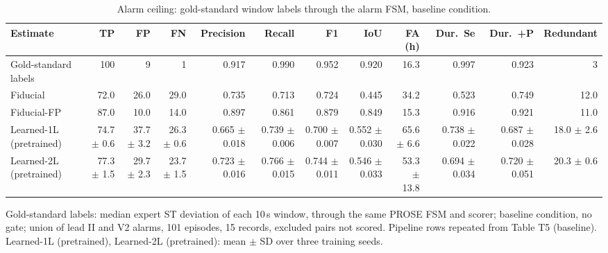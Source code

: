 \begin{table}[htbp]
\centering
\small
\caption{Alarm ceiling: gold-standard window labels through the alarm FSM, baseline condition.}
\label{tab:t5b_ceiling}
\begin{tabular}{lrrrrrrrrrrr}
\toprule
Estimate & TP & FP & FN & Precision & Recall & F1 & IoU & FA (h) & Dur.\ Se & Dur.\ +P & Redundant \\
\midrule
Gold-standard labels & 100 & 9 & 1 & 0.917 & 0.990 & 0.952 & 0.920 & 16.3 & 0.997 & 0.923 & 3 \\
\midrule
Fiducial & 72.0 & 26.0 & 29.0 & 0.735 & 0.713 & 0.724 & 0.445 & 34.2 & 0.523 & 0.749 & 12.0 \\
Fiducial-FP & 87.0 & 10.0 & 14.0 & 0.897 & 0.861 & 0.879 & 0.849 & 15.3 & 0.916 & 0.921 & 11.0 \\
Learned-1L (pretrained) & 74.7 $\pm$ 0.6 & 37.7 $\pm$ 3.2 & 26.3 $\pm$ 0.6 & 0.665 $\pm$ 0.018 & 0.739 $\pm$ 0.006 & 0.700 $\pm$ 0.007 & 0.552 $\pm$ 0.030 & 65.6 $\pm$ 6.6 & 0.738 $\pm$ 0.022 & 0.687 $\pm$ 0.028 & 18.0 $\pm$ 2.6 \\
Learned-2L (pretrained) & 77.3 $\pm$ 1.5 & 29.7 $\pm$ 2.3 & 23.7 $\pm$ 1.5 & 0.723 $\pm$ 0.016 & 0.766 $\pm$ 0.015 & 0.744 $\pm$ 0.011 & 0.546 $\pm$ 0.033 & 53.3 $\pm$ 13.8 & 0.694 $\pm$ 0.034 & 0.720 $\pm$ 0.051 & 20.3 $\pm$ 0.6 \\
\bottomrule
\end{tabular}

\par\smallskip\footnotesize Gold-standard labels: median expert ST deviation of each 10\,s window, through the same PROSE FSM and scorer; baseline condition, no gate; union of lead II and V2 alarms, 101 episodes, 15 records, excluded pairs not scored. Pipeline rows repeated from Table T5 (baseline). Learned-1L (pretrained), Learned-2L (pretrained): mean $\pm$ SD over three training seeds.
\end{table}
